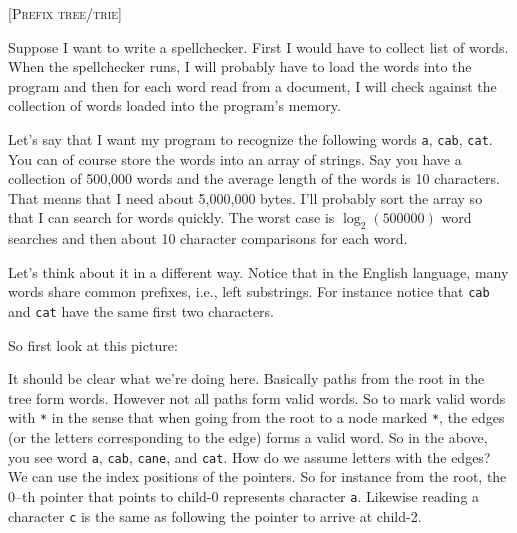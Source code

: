 \textsc{[Prefix tree/trie]}

Suppose I want to write a spellchecker.
First I would have to collect list of words.
When the spellchecker runs, I will probably have to load the words
into the program and then for each word read from a document,
I will check against the collection of words loaded into the
program's memory.

Let's say that I want my program to recognize the following words
\verb!a!, \verb!cab!, \verb!cat!.
You can of course store the words into an array of strings.
Say you have a collection of 500,000 words and the 
average length of the words is 10 characters.
That means that I need about 5,000,000 bytes.
I'll probably sort the array so that I can search for 
words quickly.
The worst case is $\log_2(500000)$ word searches and then 
about 10 character comparisons for each word.

Let's think about it in a different way.
Notice that in the English language,
many words share common prefixes, i.e., left substrings.
For instance notice that 
\verb!cab! and \verb!cat!
have the same first two characters.

So first look at this picture:


It should be clear what we're doing here.
Basically paths from the root in the tree form words.
However not all paths form valid words.
So to mark valid words with \texttt{*} in the sense that
when going from the root to a node marked \texttt{*},
the edges (or the letters corresponding to the edge) forms a valid word.
So in the above, you see word
\texttt{a},
\texttt{cab},
\texttt{cane}, and
\texttt{cat}.
How do we assume letters with the edges?
We can use the index positions of the pointers.
So for instance from the root, the 0--th pointer that points to child-0
represents character \verb!a!.
Likewise reading a character \verb!c! is the same as 
following the pointer to arrive at child-2.

